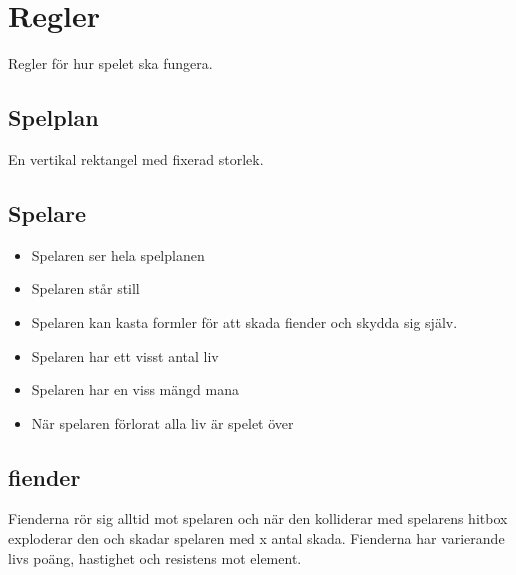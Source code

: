 \documentclass[12pt]{TDP005mall}
\begin{document}
\clearpage


\section{Regler}
Regler för hur spelet ska fungera.
\subsection{Spelplan}
En vertikal rektangel med fixerad storlek.
\subsection{Spelare}
\begin{itemize}
\item Spelaren ser hela spelplanen
\item Spelaren står still
\item Spelaren kan kasta formler för att skada fiender och skydda sig själv.
\item Spelaren har ett visst antal liv
\item Spelaren har en viss mängd mana
\item När spelaren förlorat alla liv är spelet över
\end{itemize}
\subsection{fiender}
Fienderna rör sig alltid mot spelaren och när den kolliderar med spelarens hitbox exploderar den och skadar spelaren med x antal skada. Fienderna har varierande livs poäng, hastighet och resistens mot element.
\newpage
\end{document}
